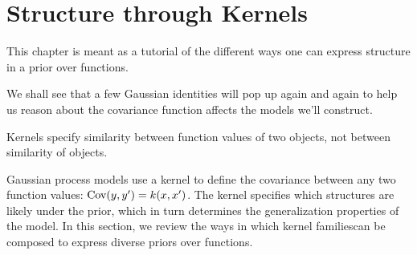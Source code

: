 
\inbpdocument

\chapter{Structure through Kernels}
\label{ch:kernels}


This chapter is meant as a tutorial of the different ways one can express structure in a prior over functions.

We shall see that a few Gaussian identities will pop up again and again to help us reason about the covariance function affects the models we'll construct.


Kernels specify similarity between function values of two objects, not between similarity of objects.



Gaussian process models use a kernel to define the covariance between any two function values: ${\textrm{Cov}(y, y') = k(x,x')}$.
The kernel specifies which structures are likely under the \gp{} prior, which in turn determines the generalization properties of the model.
%
%
In this section, we review the ways in which kernel families\footnotemark can be composed to express diverse priors over functions. 

